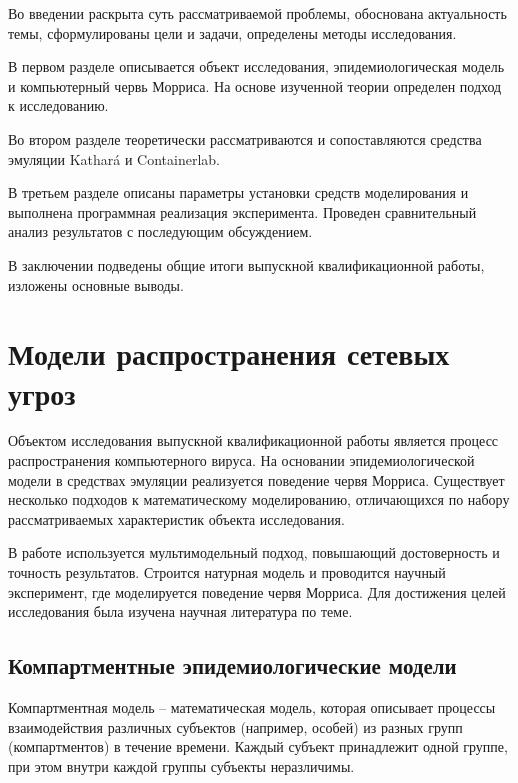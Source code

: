 \documentclass[
  english,
  russian,
  12pt,
  a4paper,
]{phdthesr}
\begin{document}
Во введении раскрыта суть рассматриваемой проблемы, обоснована
актуальность темы, сформулированы цели и задачи, определены методы
исследования.

В первом разделе описывается объект исследования, эпидемиологическая
модель и компьютерный червь Морриса. На основе изученной теории
определен подход к исследованию.

Во втором разделе теоретически рассматриваются и сопоставляются средства
эмуляции Kathará и Containerlab.

В третьем разделе описаны параметры установки средств моделирования и
выполнена программная реализация эксперимента. Проведен сравнительный
анализ результатов с последующим обсуждением.

В заключении подведены общие итоги выпускной квалификационной работы,
изложены основные выводы.


\chapter{Модели распространения сетевых
угроз}\label{ux43cux43eux434ux435ux43bux438-ux440ux430ux441ux43fux440ux43eux441ux442ux440ux430ux43dux435ux43dux438ux44f-ux441ux435ux442ux435ux432ux44bux445-ux443ux433ux440ux43eux437}

Объектом исследования выпускной квалификационной работы является процесс
распространения компьютерного вируса. На основании эпидемиологической
модели в средствах эмуляции реализуется поведение червя Морриса.
Существует несколько подходов к математическому моделированию,
отличающихся по набору рассматриваемых характеристик объекта
исследования.

В работе используется мультимодельный подход, повышающий достоверность и
точность результатов. Строится натурная модель и проводится научный
эксперимент, где моделируется поведение червя Морриса. Для достижения
целей исследования была изучена научная литература по теме.

\section{Компартментные эпидемиологические
модели}\label{ux43aux43eux43cux43fux430ux440ux442ux43cux435ux43dux442ux43dux44bux435-ux44dux43fux438ux434ux435ux43cux438ux43eux43bux43eux433ux438ux447ux435ux441ux43aux438ux435-ux43cux43eux434ux435ux43bux438}

Компартментная модель -- математическая модель, которая описывает
процессы взаимодействия различных субъектов (например, особей) из разных
групп (компартментов) в течение времени. Каждый субъект принадлежит
одной группе, при этом внутри каждой группы субъекты неразличимы.
\end{document}
